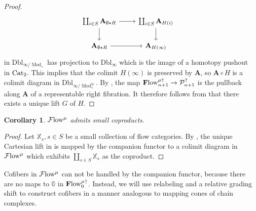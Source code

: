 \documentclass[10pt]{amsart}
\numberwithin{equation}{section}
\newtheorem{cor}[prop]{Corollary}
\theoremstyle{definition}
\DeclareMathOperator{\Mod}{Mod}
\newcommand{\Flow}{\cF\mathrm{low}\vphantom{w}}
\newcommand{\bfFlow}{\mathbf{F}\mathrm{low}\vphantom{w}}
\newcommand{\bfPreFlow}{\mathbf{F}\mathrm{low}\vphantom{w}}
\newcommand{\Cat}{\mathrm{Cat}\vphantom{t}}
\newcommand{\bX}{\mathbb{X}}
\newcommand{\bZero}{\mathbb{0}}
\newcommand{\cP}{\mathcal{P}}
\newcommand{\cF}{\mathcal{F}}
\newcommand{\bfA}{\mathbf{A}}
\newcommand{\Dbl}{\mathrm{Dbl}}
\newcommand{\join}{\star}
\renewcommand{\to}{\mathchoice{\longrightarrow}{\rightarrow}{}{}}
\begin{document}
\begin{proof}
	\begin{equation*}
		\begin{tikzcd}
			\coprod_{i\in S} \bfA_{\emptyset \join R} \arrow[r] \arrow[d]      &   \coprod_{i\in S} \bfA_{H(i)}  \arrow[d] \\
			\bfA_{\emptyset \join R}  \arrow[r]               &   \bfA_{H(\infty)}
		\end{tikzcd}
	\end{equation*}
	in $\Dbl_{\infty/\Mod_{\diamond}}$ has projection to $\Dbl_{\infty}$ which is the image of a homotopy pushout in $\Cat_{2}$.
  This implies that the colimit $H(\infty)$ is preserved by $\bfA$, so $\bfA \circ H$ is a colimit diagram in $\Dbl_{\infty/\Mod_{\diamond}^{\otimes}}$.
  By , the map $\bfFlow^{\mu\uparrow}_{n+1} \to \cP^{\uparrow}_{n+1}$ is the pullback along $\bfA$ of a representable right fibration.
  It therefore follows from  that there exists a unique lift $G$ of $H$.
\end{proof}

\begin{cor}\label{cor:coproducts_in_flow}
	$\Flow^{\mu}$ admits small coproducts.
\end{cor}

\begin{proof}
	Let $\bX_{s}, s\in S$ be a small collection of flow categories.
  By , the unique Cartesian lift in  is mapped by the companion functor to a colimit diagram in $\Flow^{\mu}$ which exhibits $\coprod_{s\in S} \bX_{s}$ as the coproduct.
\end{proof}

Cofibers in $\Flow^{\mu}$ can not be handled by the companion functor, because there are no maps to $\bZero$ in $\bfPreFlow^{\mu\uparrow}_{0}$.
Instead, we will use relabeling and a relative grading shift to construct cofibers in a manner analogous to mapping cones of chain complexes.
\end{document}
